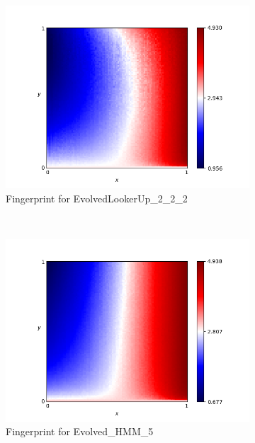 \documentclass{article}
\begin{document}
\begin{figure}[!hbtp]
    \centering
    \begin{subfigure}[t]{.3\textwidth}
        \centering
        \includegraphics[width=\textwidth]{./assets/EvolvedLookerUp2_2_2.png}
        \caption{Fingerprint for EvolvedLookerUp\_2\_2\_2}
    \end{subfigure}%
    ~
    \begin{subfigure}[t]{.3\textwidth}
        \centering
        \includegraphics[width=\textwidth]{./assets/Evolved_HMM_5.png}
        \caption{Fingerprint for Evolved\_HMM\_5}
    \end{subfigure}%
    ~
    \begin{subfigure}[t]{.3\textwidth}

\end{subfigure}
\end{figure}
\end{document}
